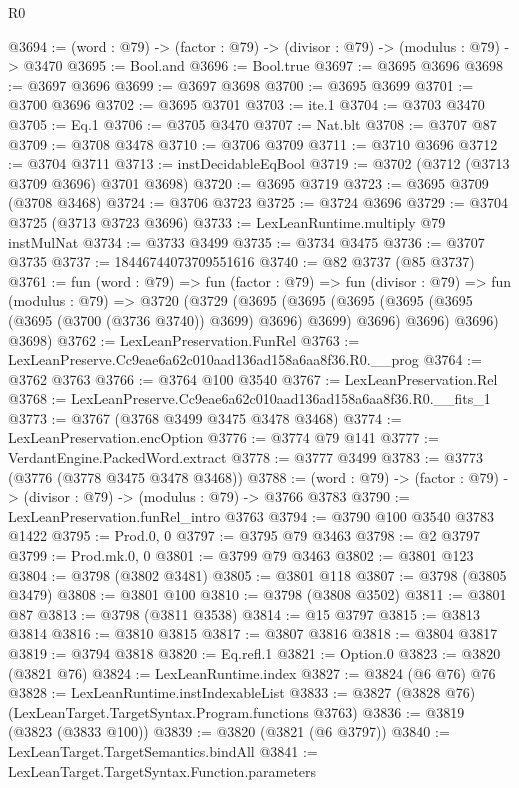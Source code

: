 \begin{lexlean}{R0}
\begin{coremodule}
@3694 := (word : @79) -> (factor : @79) -> (divisor : @79) -> (modulus : @79) -> @3470
@3695 := Bool.and
@3696 := Bool.true
@3697 := @3695 @3696
@3698 := @3697 @3696
@3699 := @3697 @3698
@3700 := @3695 @3699
@3701 := @3700 @3696
@3702 := @3695 @3701
@3703 := ite.{1}
@3704 := @3703 @3470
@3705 := Eq.{1}
@3706 := @3705 @3470
@3707 := Nat.blt
@3708 := @3707 @87
@3709 := @3708 @3478
@3710 := @3706 @3709
@3711 := @3710 @3696
@3712 := @3704 @3711
@3713 := instDecidableEqBool
@3719 := @3702 (@3712 (@3713 @3709 @3696) @3701 @3698)
@3720 := @3695 @3719
@3723 := @3695 @3709 (@3708 @3468)
@3724 := @3706 @3723
@3725 := @3724 @3696
@3729 := @3704 @3725 (@3713 @3723 @3696)
@3733 := LexLeanRuntime.multiply @79 instMulNat
@3734 := @3733 @3499
@3735 := @3734 @3475
@3736 := @3707 @3735
@3737 := 18446744073709551616
@3740 := @82 @3737 (@85 @3737)
@3761 := fun (word : @79) =>
  fun (factor : @79) =>
  fun (divisor : @79) =>
  fun (modulus : @79) =>
  @3720
    (@3729
      (@3695
        (@3695 (@3695 (@3695 (@3695 (@3695 (@3700 (@3736 @3740)) @3699) @3696) @3699) @3696) @3696)
        @3696)
      @3698)
@3762 := LexLeanPreservation.FunRel
@3763 := LexLeanPreserve.Cc9eae6a62c010aad136ad158a6aa8f36.R0.__prog
@3764 := @3762 @3763
@3766 := @3764 @100 @3540
@3767 := LexLeanPreservation.Rel
@3768 := LexLeanPreserve.Cc9eae6a62c010aad136ad158a6aa8f36.R0.__fits_1
@3773 := @3767 (@3768 @3499 @3475 @3478 @3468)
@3774 := LexLeanPreservation.encOption
@3776 := @3774 @79 @141
@3777 := VerdantEngine.PackedWord.extract
@3778 := @3777 @3499
@3783 := @3773 (@3776 (@3778 @3475 @3478 @3468))
@3788 := (word : @79) -> (factor : @79) -> (divisor : @79) -> (modulus : @79) -> @3766 @3783
@3790 := LexLeanPreservation.funRel_intro @3763
@3794 := @3790 @100 @3540 @3783 @1422
@3795 := Prod.{0, 0}
@3797 := @3795 @79 @3463
@3798 := @2 @3797
@3799 := Prod.mk.{0, 0}
@3801 := @3799 @79 @3463
@3802 := @3801 @123
@3804 := @3798 (@3802 @3481)
@3805 := @3801 @118
@3807 := @3798 (@3805 @3479)
@3808 := @3801 @100
@3810 := @3798 (@3808 @3502)
@3811 := @3801 @87
@3813 := @3798 (@3811 @3538)
@3814 := @15 @3797
@3815 := @3813 @3814
@3816 := @3810 @3815
@3817 := @3807 @3816
@3818 := @3804 @3817
@3819 := @3794 @3818
@3820 := Eq.refl.{1}
@3821 := Option.{0}
@3823 := @3820 (@3821 @76)
@3824 := LexLeanRuntime.index
@3827 := @3824 (@6 @76) @76
@3828 := LexLeanRuntime.instIndexableList
@3833 := @3827 (@3828 @76) (LexLeanTarget.TargetSyntax.Program.functions @3763)
@3836 := @3819 (@3823 (@3833 @100))
@3839 := @3820 (@3821 (@6 @3797))
@3840 := LexLeanTarget.TargetSemantics.bindAll
@3841 := LexLeanTarget.TargetSyntax.Function.parameters

\end{coremodule}
\end{lexlean}
